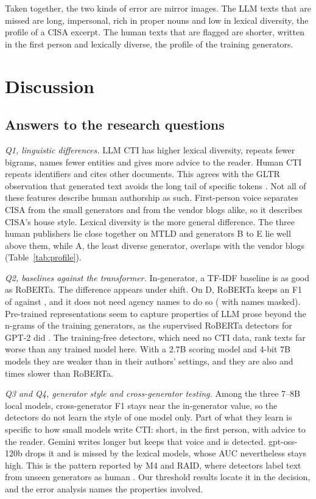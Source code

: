 \documentclass[journal]{IEEEtran}
\begin{document}
Taken together, the two kinds of error are mirror images. The LLM texts that are missed are long, impersonal, rich
in proper nouns and low in lexical diversity, the profile of a CISA excerpt. The human texts that are flagged are
shorter, written in the first person and lexically diverse, the profile of the training generators.

\section{Discussion}\label{sec:discussion}
\subsection{Answers to the research questions}
\emph{Q1, linguistic differences.} LLM CTI has higher lexical diversity, repeats fewer bigrams, names fewer
entities and gives more advice to the reader. Human CTI repeats identifiers and cites other documents. This agrees
with the GLTR observation that generated text avoids the long tail of specific tokens \cite{Gehrmann_2019}. Not all
of these features describe human authorship as such. First-person voice separates CISA from the small generators
and from the vendor blogs alike, so it describes CISA's house style. Lexical diversity is the more general
difference. The three human publishers lie close together on MTLD and generators B to E lie well above them,
while A, the least diverse generator, overlaps with the vendor blogs (Table~\ref{tab:profile}).

\emph{Q2, baselines against the transformer.} In-generator, a TF-IDF baseline is as good as RoBERTa. The difference
appears under shift. On D, RoBERTa keeps an F1 of \FoneDTrans{} against \FoneDLexLR{}, and it does not need agency
names to do so (\AblTransformerMaskedD{} with names masked). Pre-trained representations seem to capture properties
of LLM prose beyond the n-grams of the training generators, as the supervised RoBERTa detectors for GPT-2 did
\cite{Solaiman_2019}. The training-free detectors, which need no CTI data, rank texts far worse than any trained
model here. With a 2.7B scoring model and 4-bit 7B models they are weaker than in their authors' settings, and
they are also \RelFast{} and \RelBino{} times slower than RoBERTa.

\emph{Q3 and Q4, generator style and cross-generator testing.} Among the three 7--8B local models, cross-generator
F1 stays near the in-generator value, so the detectors do not learn the style of one model only. Part of what they
learn is specific to how small models write CTI: short, in the first person, with advice to the reader. Gemini
writes longer but keeps that voice and is detected. gpt-oss-120b drops it and is missed by the lexical models,
whose AUC nevertheless stays high. This is the pattern reported by M4 and RAID, where detectors label text from
unseen generators as human \cite{Wang_2024,Dugan_2024}. Our threshold results locate it in the decision, and the
error analysis names the properties involved.
\end{document}
